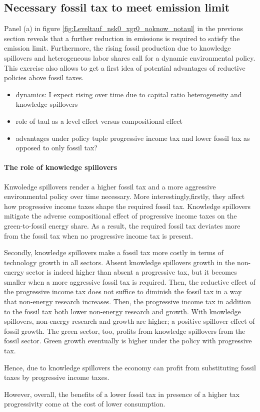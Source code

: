  \clearpage
 
 \subsection{Necessary fossil tax to meet emission limit}
 Panel (a) in figure \ref{fig:Leveltauf_nsk0_xgr0_noknow_notaul} in the previous section reveals that a further reduction in emissions is required to satisfy the emission limit. Furthermore, the rising fossil production due to knowledge spillovers and heterogeneous labor shares call for a dynamic environmental policy. 
 This exercise also allows to get a first idea of potential advantages of reductive policies above fossil taxes. 
 
 \begin{itemize}
 	\item dynamics: I expect rising over time due to capital ratio heterogeneity and knowledge spillovers
 	\item role of taul as a level effect versus compositional effect
 	\item advantages under policy tuple progressive income tax and lower fossil tax as opposed to only fossil tax?
 \end{itemize}

\paragraph{The role of knowledge spillovers}
Knwoledge spillovers render a higher fossil tax and a more aggressive environmental policy over time necessary. 
More interestingly,firstly, they affect how progressive income taxes shape the required fossil tax. Knowledge spillovers mitigate the adverse compositional effect of progressive income taxes on the green-to-fossil energy share. As a result, the required fossil tax deviates more from the fossil tax when no progressive income tax is present. 

Secondly, knowledge spillovers make a fossil tax more costly in terms of technology growth in all sectors.  
Absent knowledge spillovers growth in the non-energy sector is indeed higher than absent a progressive tax, but it becomes smaller when a more aggressive fossil tax is required. Then, the reductive effect of the progressive income tax does not suffice to diminish the fossil tax in a way that non-energy research increases. Then, the progressive income tax in addition to the fossil tax both lower non-energy research and growth. With knowledge spillovers, non-energy research and growth are higher; a positive spillover effect of fossil growth. The green sector, too, profits from knowledge spillovers from the fossil sector. Green growth eventually is higher under the policy with progressive tax. 

Hence, due to knowledge spillovers the economy can profit from substituting fossil taxes by progressive income taxes. 

However, overall, the benefits of a lower fossil tax in presence of a higher tax progressivity come at the cost of lower consumption. 
